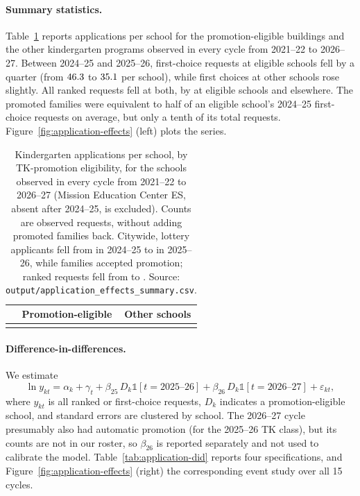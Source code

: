 \documentclass{article}
\begin{document}
\paragraph{Summary statistics.} Table~\ref{tab:application-summary} reports applications per school for the \numDidEligible{} promotion-eligible buildings and the \numDidOther{} other kindergarten programs observed in every cycle from 2021--22 to 2026--27. Between 2024--25 and 2025--26, first-choice requests at eligible schools fell by a quarter (from $46.3$ to $35.1$ per school), while first choices at other schools rose slightly. All ranked requests fell at both, by \numAllChangeEligible{} at eligible schools and \numAllChangeOther{} elsewhere. The promoted families were equivalent to half of an eligible school's 2024--25 first-choice requests on average, but only a tenth of its total requests. Figure~\ref{fig:application-effects} (left) plots the series.

\begin{table}
\centering
\small
\begin{tabular}{lcc}
 & Promotion-eligible & Other schools \\ \hline
{}{application_summary}
\end{tabular}
\caption{Kindergarten applications per school, by TK-promotion eligibility, for the \numDidSchools{} schools observed in every cycle from 2021--22 to 2026--27 (Mission Education Center ES, absent after 2024--25, is excluded). Counts are observed requests, without adding promoted families back. Citywide, lottery applicants fell from \numApplicantsPrev{} in 2024--25 to \numApplicantsTreat{} in 2025--26, while \numPromoted{} families accepted promotion; ranked requests fell from \numRequestsPrev{} to \numRequestsNow. Source: \texttt{output/application\_effects\_summary.csv}.}
\label{tab:application-summary}
\end{table}

\paragraph{Difference-in-differences.} We estimate
\[
\ln y_{kt} = \alpha_k + \gamma_t + \beta_{25}\, D_k \mathbb{1}[t = \text{2025--26}] + \beta_{26}\, D_k \mathbb{1}[t = \text{2026--27}] + \varepsilon_{kt},
\]
where $y_{kt}$ is all ranked or first-choice requests, $D_k$ indicates a promotion-eligible school, and standard errors are clustered by school. The 2026--27 cycle presumably also had automatic promotion (for the 2025--26 TK class), but its counts are not in our roster, so $\beta_{26}$ is reported separately and not used to calibrate the model. Table~\ref{tab:application-did} reports four specifications, and Figure~\ref{fig:application-effects} (right) the corresponding event study over all 15 cycles.
\end{document}
